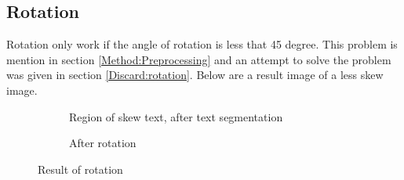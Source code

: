 \documentclass[Report.tex]{subfiles}
\begin{document}
\subsection{Rotation}
Rotation only work if the angle of rotation is less that 45 degree. This problem is mention in section \ref{Method:Preprocessing} and an attempt to solve the problem was given in section \ref{Discard:rotation}. Below are a result image of a less skew image.

\begin{figure}[ht]
  \centering
  \begin{subfigure}[t]{6cm}
    \caption{Region of skew text, after text segmentation}
  \end{subfigure}
  \hspace{2cm}%
  \begin{subfigure}[t]{6cm}
    \caption{After rotation}
  \end{subfigure}

  \caption{Result of rotation}
  \label{fig:result:rotation}
\end{figure}
\end{document}
